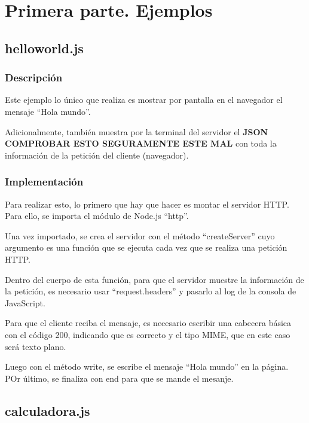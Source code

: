 \documentclass{article}
\begin{document}

\section{Primera parte. Ejemplos}
\subsection{helloworld.js}
\subsubsection{Descripción}
Este ejemplo lo único que realiza es mostrar por pantalla en el navegador el mensaje ``Hola mundo''.

Adicionalmente, también muestra por la terminal del servidor el \textbf{JSON COMPROBAR ESTO SEGURAMENTE ESTE MAL} con toda la información de la petición del cliente (navegador).


\subsubsection{Implementación}
Para realizar esto, lo primero que hay que hacer es montar el servidor HTTP. Para ello, se importa el módulo de Node.js ``http''.

Una vez importado, se crea el servidor con el método ``createServer'' cuyo argumento es una función que se ejecuta cada vez que se realiza una petición HTTP.

Dentro del cuerpo de esta función, para que el servidor muestre la información de la petición, es necesario usar ``request.headers'' y pasarlo al log de la consola de JavaScript.

Para que el cliente reciba el mensaje, es necesario escribir una cabecera básica con el código 200, indicando que es correcto y el tipo MIME, que en este caso será texto plano.

Luego con el método write, se escribe el mensaje ``Hola mundo'' en la página. POr último, se finaliza con end para que se mande el mesanje. %


\subsection{calculadora.js}
\end{document}
